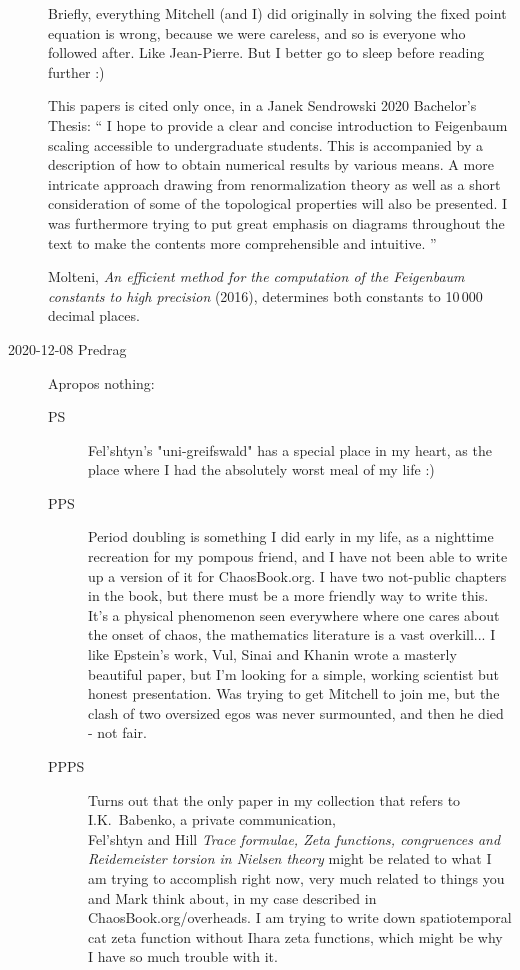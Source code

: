 \begin{description}
Briefly, everything Mitchell (and I) did originally in solving the fixed
point equation is wrong, because we were careless, and so is everyone who
followed after. Like Jean-Pierre. But I better go to sleep before reading
further :)

This papers is cited only once, in a Janek  Sendrowski 2020
{Bachelor's Thesis}: ``
I hope to provide a clear and concise introduction to Feigenbaum scaling
accessible to undergraduate students.   This  is  accompanied  by  a
description  of  how  to obtain numerical results by various means.  A
more intricate approach drawing from renormalization theory as well as
a short consideration of some of the topological properties will also be
presented.  I was furthermore trying to put great emphasis on diagrams
throughout the text to make the contents more comprehensible and
intuitive.
''

Molteni, {\em An efficient method for the computation of
the {Feigenbaum} constants to high precision} (2016),
determines both constants to 10\,000 decimal places.


\item[2020-12-08 Predrag] Apropos nothing:
\begin{description}
  \item[PS]
Fel{'s}htyn's "uni-greifswald" has a special place in my
heart, as the place where I had the absolutely
{worst meal of my life} :)
  \item[PPS]
Period doubling is something I did early in my life, as a nighttime
recreation for my pompous friend, and I have not been able to write up a
version of it for ChaosBook.org. I have two not-public chapters in the
book, but there must be a more friendly way to write this. It's a
physical phenomenon seen everywhere where one cares about the onset of
chaos, the mathematics literature is a vast overkill... I like Epstein's
work, Vul, Sinai and Khanin
wrote a masterly beautiful paper, but I'm looking for a simple, working
scientist but honest presentation. Was trying to get Mitchell to join me,
but the clash of two oversized egos was never surmounted, and then he
died - not fair.
  \item[PPPS]
Turns out that the only paper in my collection that refers to I.K.~Babenko,
a private communication, \\
Fel{'s}htyn and Hill {\em Trace formulae, {Zeta}
functions, congruences and {Reidemeister} torsion in {Nielsen} theory}
 might be related to what I am trying to
accomplish right now, very much related to things you and Mark think
about, in my case described in
{ChaosBook.org/overheads}. I am trying to write down spatiotemporal cat
zeta function without Ihara zeta functions, which might be why I have so
much trouble with it.
\end{description}


\end{description}
